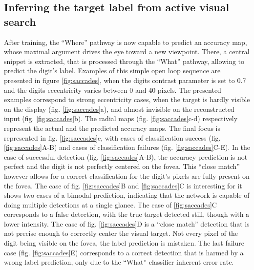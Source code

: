 \subsection{Inferring the target label from active visual search}
After training, the ``Where'' pathway is now capable to predict an accuracy map, whose maximal argument drives the eye toward a new viewpoint. There, a central snippet is extracted, that is processed through the ``What'' pathway, allowing to predict the digit's label. Examples of this simple open loop sequence are presented in figure \ref{fig:saccades}, when the digits contrast parameter is set to 0.7 and the digits eccentricity varies between 0 and 40 pixels. The presented examples correspond to strong eccentricity cases, when the target is hardly visible on the display (fig. \ref{fig:saccades}a), and almost invisible on the reconstructed input (fig. \ref{fig:saccades}b). The radial maps (fig. \ref{fig:saccades}c-d) respectively represent the actual and the predicted accuracy maps. The final focus is represented in fig. \ref{fig:saccades}e, with cases of classification success (fig. \ref{fig:saccades}A-B) and cases of classification failures (fig. \ref{fig:saccades}C-E).  
In the case of successful detection (fig. \ref{fig:saccades}A-B), the accuracy prediction is not perfect and the digit is not perfectly centered on the fovea. This ``close match'' however allows for a correct classification for the digit's pixels are fully present on the fovea. The case of fig. \ref{fig:saccades}B and \ref{fig:saccades}C
 is interesting for it shows two cases of a bimodal prediction, indicating that the network is capable of doing multiple detections at a single glance. The case of \ref{fig:saccades}C corresponds to a false detection, with the true target detected still, though with a lower intensity. The case of fig. \ref{fig:saccades}D is a ``close match'' detection that is not precise enough to correctly center the visual target. Not every pixel of the digit being visible on the fovea, the label prediction is mistaken.
The last failure case (fig. \ref{fig:saccades}E) corresponds to a correct detection that is harmed by a wrong label prediction, only due to the ``What'' classifier inherent error rate.  


